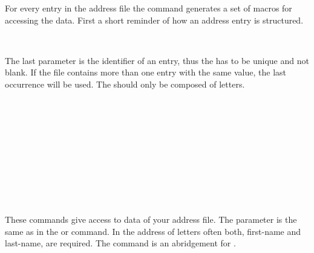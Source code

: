 For every entry in the address file the command generates a
set of macros for accessing the data. 
First a short reminder of how an address entry is structured.

\begin{Declaration}%
  \\
\end{Declaration}%
The last parameter is the identifier of an entry, thus the
 has to be unique and not blank.  If the file contains more
than one entry with the same  value, the last occurrence
will be used.  The  should only be composed of letters.
\begin{Declaration}
\\
\\
\\
\\
\\
\\
\\
\\
\\
\end{Declaration}%
%
%
%
%
%
These commands give access to data of your address file.
The parameter  is the same as in the
 or  command.
In the address of letters often both, first-name and
last-name, are required.
The command  is an abridgement for
 .

%
%
%
%
%

